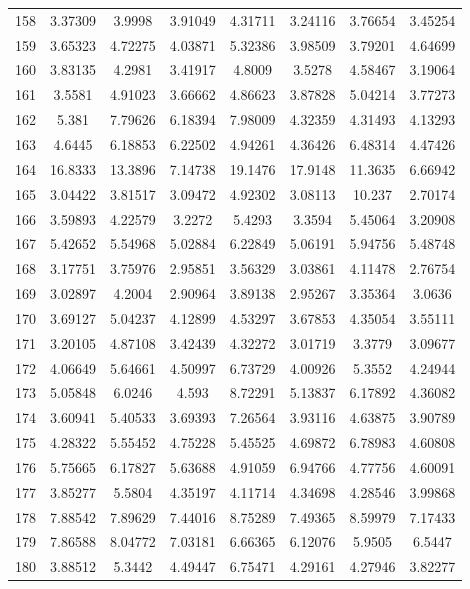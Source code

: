 \begin{center}
\begin{longtable}{cccccccc}
158 & 3.37309 & 3.9998 & 3.91049 & 4.31711 & 3.24116 & 3.76654 & 3.45254\\
159 & 3.65323 & 4.72275 & 4.03871 & 5.32386 & 3.98509 & 3.79201 & 4.64699\\
160 & 3.83135 & 4.2981 & 3.41917 & 4.8009 & 3.5278 & 4.58467 & 3.19064\\
161 & 3.5581 & 4.91023 & 3.66662 & 4.86623 & 3.87828 & 5.04214 & 3.77273\\
162 & 5.381 & 7.79626 & 6.18394 & 7.98009 & 4.32359 & 4.31493 & 4.13293\\
163 & 4.6445 & 6.18853 & 6.22502 & 4.94261 & 4.36426 & 6.48314 & 4.47426\\
164 & 16.8333 & 13.3896 & 7.14738 & 19.1476 & 17.9148 & 11.3635 & 6.66942\\
165 & 3.04422 & 3.81517 & 3.09472 & 4.92302 & 3.08113 & 10.237 & 2.70174\\
166 & 3.59893 & 4.22579 & 3.2272 & 5.4293 & 3.3594 & 5.45064 & 3.20908\\
167 & 5.42652 & 5.54968 & 5.02884 & 6.22849 & 5.06191 & 5.94756 & 5.48748\\
168 & 3.17751 & 3.75976 & 2.95851 & 3.56329 & 3.03861 & 4.11478 & 2.76754\\
169 & 3.02897 & 4.2004 & 2.90964 & 3.89138 & 2.95267 & 3.35364 & 3.0636\\
170 & 3.69127 & 5.04237 & 4.12899 & 4.53297 & 3.67853 & 4.35054 & 3.55111\\
171 & 3.20105 & 4.87108 & 3.42439 & 4.32272 & 3.01719 & 3.3779 & 3.09677\\
172 & 4.06649 & 5.64661 & 4.50997 & 6.73729 & 4.00926 & 5.3552 & 4.24944\\
173 & 5.05848 & 6.0246 & 4.593 & 8.72291 & 5.13837 & 6.17892 & 4.36082\\
174 & 3.60941 & 5.40533 & 3.69393 & 7.26564 & 3.93116 & 4.63875 & 3.90789\\
175 & 4.28322 & 5.55452 & 4.75228 & 5.45525 & 4.69872 & 6.78983 & 4.60808\\
176 & 5.75665 & 6.17827 & 5.63688 & 4.91059 & 6.94766 & 4.77756 & 4.60091\\
177 & 3.85277 & 5.5804 & 4.35197 & 4.11714 & 4.34698 & 4.28546 & 3.99868\\
178 & 7.88542 & 7.89629 & 7.44016 & 8.75289 & 7.49365 & 8.59979 & 7.17433\\
179 & 7.86588 & 8.04772 & 7.03181 & 6.66365 & 6.12076 & 5.9505 & 6.5447\\
180 & 3.88512 & 5.3442 & 4.49447 & 6.75471 & 4.29161 & 4.27946 & 3.82277\\

\end{longtable}
\end{center}
